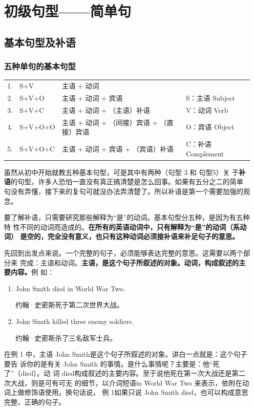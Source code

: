 \part{初级句型——简单句}

\chapter{基本句型及补语}

\section{五种单句的基本句型}

\begin{longtable}[]{@{}llll@{}}
  1. & S+V & 主语 + 动词 & \\
  2. & S+V+O & 主语 + 动词 + 宾语 & S：主语 Subject \\
  3. & S+V+C & 主语 + 动词 + （主语）补语 & V：动词 Verb \\
  4. & S+V+O+O & 主语 + 动词 + （间接）宾语 + （直接）宾语 & O：宾语 Object \\
  5. & S+V+O+C & 主语 + 动词 + 宾语 + （宾语）补语 & C：补语 Complement
\end{longtable}

虽然从初中开始就教五种基本句型，可是其中有两种（句型 3 和 句型5）关
于\textbf{补语}的句型，许多人恐怕一直没有真正搞清楚是怎么回事。如果有五分之二的简单
句没有弄懂，接下来的复句可就没办法弄清楚了。所以补语是第一个需要加强的观念。

要了解补语，只需要研究那些解释为“是”的动词。基本句型分五种，是因为有五种特
性不同的动词而造成的。\textbf{在所有的英语动词中，只有解释为“是”的动词（系动词）
  是空的，完全没有意义，也只有这种动词必须接补语来补足句子的意思。}

先回到出发点来说。一个完整的句子，必须能够表达完整的意思。这需要以两个部分来
完成：主语和动词。\textbf{主语，是这个句子所叙述的对象。动词，构成叙述的主要内容。}例
如：

\begin{enumerate}
\item John Smith died in World War Two.

  约翰·史密斯死于第二次世界大战。
\item John Simth killed three enemy soldiers.

  约翰·史密斯杀了三名敌军士兵。
\end{enumerate}

在例 1 中，主语 John Smith是这个句子所叙述的对象。讲白一点就是：这个句子要告
诉你的是有关 John Smith 的事情。是什么事情呢？主要是：他“死了”（died）。动
词 died构成叙述的主要内容。至于说他死在第一次大战还是第二次大战，则是可有可无
的细节，以介词短语in World War Two 来表示，依附在动词上做修饰语使用。换句话说，
例 1如果只说 John Smith died，也可以构成意思完整、正确的句子。

